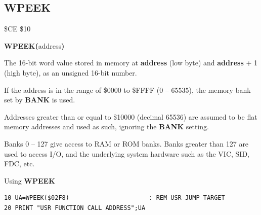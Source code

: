 
\newpage
\subsection{WPEEK}
\begin{description}[leftmargin=2cm,style=nextline]
\item [Token:]    \$CE \$10

\item [Format:]   {\bf WPEEK(}address{\bf)}

\item [Returns:]  The 16-bit word value stored in memory at {\bf address} (low byte) and {\bf address} + 1 (high byte), as an unsigned 16-bit number.

                  If the address is in the range of \$0000 to \$FFFF (0 -- 65535), the memory bank set by {\bf BANK} is used.

                  Addresses greater than or equal to \$10000 (decimal 65536) are assumed to be flat memory addresses and used as such, ignoring the {\bf BANK} setting.

\item [Remarks:]  Banks 0 -- 127 give access to RAM or ROM banks. Banks greater than 127 are used to access I/O, and the underlying system hardware such as the VIC, SID, FDC, etc.

\item [Example:]  Using {\bf WPEEK}

\begin{tcolorbox}[colback=black,coltext=white]
\verbatimfont{\codefont}
\begin{verbatim}
10 UA=WPEEK($02F8)                      : REM USR JUMP TARGET
20 PRINT "USR FUNCTION CALL ADDRESS";UA
\end{verbatim}
\end{tcolorbox}
\end{description}


\newpage
